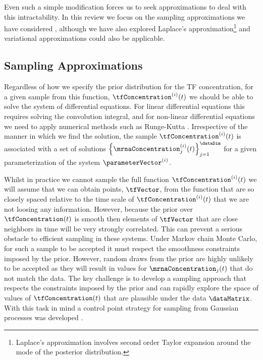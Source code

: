 \documentclass{article}
\begin{document}
Even such a simple modification forces us to seek approximations to
deal with this intractability. In this review we focus on the sampling
approximations we have considered
\citep{Titsias:efficient08,Titsias:timeseries10}, although we have
also explored Laplace's approximation\footnote{Laplace's approximation
  involves second order Taylor expansion around the mode of the
  posterior distribution.}
\citep[see]{Lawrence:transcriptionalGP06,Gao:latent08,Lawrence:licsbgp10}
and variational approximations could also be applicable.

\subsection{Sampling Approximations}

Regardless of how we specify the prior distribution for the TF
concentration, for a given sample from this function,
$\tfConcentration^{(i)}(t)$ we should be able to solve the system of
differential equations. For linear differential equations this
requires solving the convolution integral, and for non-linear
differential equations we need to apply numerical methods such as
Runge-Kutta \citep{}. Irrespective of the manner in which we find the
solution, the sample $\tfConcentration^{(i)}(t)$ is associated with a
set of solutions
$\left\{\mrnaConcentration_j^{(i)}(t)\right\}_{j=1}^\dataDim$ for a
given parameterization of the system $\parameterVector^{(i)}$.

Whilst in practice we cannot sample the full function
$\tfConcentration^{(i)}(t)$ we will assume that we can obtain points,
$\tfVector$, from the function that are so closely spaced relative to
the time scale of $\tfConcentration^{(i)}(t)$ that we are not loosing
any information. However, because the prior over $\tfConcentration(t)$
is smooth then elements of $\tfVector$ that are close neighbors in
time will be very strongly correlated. This can prevent a serious
obstacle to efficient sampling in these systems. Under Markov chain
Monte Carlo, for such a sample to be accepted it must respect the
smoothness constraints imposed by the prior. However, random draws
from the prior are highly unlikely to be accepted as they will result
in values for $\mrnaConcentration_j(t)$ that do not match the
data. The key challenge is to develop a sampling approach that
respects the constraints imposed by the prior and can rapidly explore
the space of values of $\tfConcentration(t)$ that are plausible under
the data $\dataMatrix$. With this task in mind a control point
strategy for sampling from Gaussian processes was developed
\citep{Titsias:efficient08,Titsias:timeseries10}.
\end{document}

